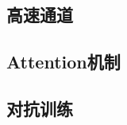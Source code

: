 
\subsection{高速通道} %
\label{sub:高速通道}


\subsection{Attention机制} %
\label{sub:attention机制}


\subsection{对抗训练} %
\label{sub:对抗训练}



